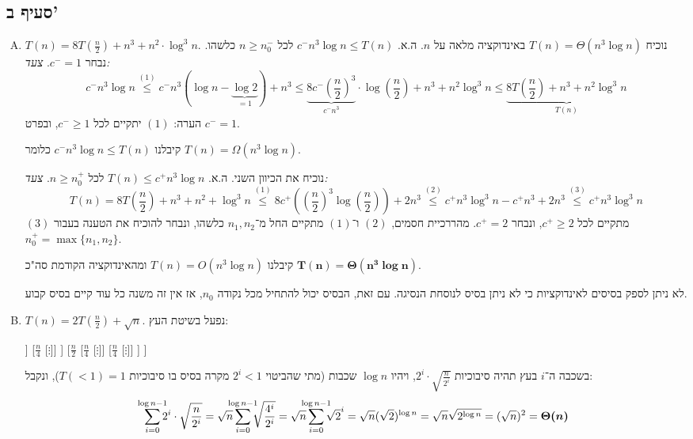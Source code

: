 \documentclass[]{article}
\newcommand\sen   {\begin{otherlanguage}{english}}
\newcommand\she   {\end{otherlanguage}}
\newcommand\logn  {\log n}
\newcommand\cl [1]    {\left ( #1 \right )}
\theoremstyle{definition}
\begin{document}
	\subsection{סעיף ב'}
	\begin{enumerate}[A.]
		\item $T(n) = 8T\cl{\frac{n}{2}} + n^3 + n^2 \cdot \log^3n$. נוכיח $T(n) = \Theta\cl{n^3\log n}$ באינדוקציה מלאה על $n$. ה.א. $c^-n^3\logn \le T(n)$ לכל $n \ge n_0^-$ כלשהו.
		נבחר $c^- = 1$. 
		\textit{צעד: }
		\[ c^-n^3\logn \overset{(1)}{\le} c^-n^3(\logn - \underbrace{\log 2}_{=1}) + n^3 \le \underbrace{8c^-\cl{\frac{n}{2}}^3}_{c^-n^3} \cdot \log\cl{\frac{n}{2}} + n^3 + n^2\log^3n \le \underbrace{8T\cl{\frac{n}{2}} + n^3 + n^2\log^3n}_{T(n)} \]
		הערה: $(1)$ יתקיים לכל $c^- \ge 1$, ובפרט $c^- = 1$. 
		
		קיבלנו $c^-n^3\log n \le T(n)$ כלומר $T(n) = \Omega\cl{n^3 \log n}$. 
		
		נוכיח את הכיוון השני. ה.א. $T(n) \le c^+n^3\logn$ לכל $n \ge n_0^+$. 
		\textit{צעד: }
		\[ T(n) = 8T\cl{\frac{n}{2}} + n^3 + n^2 + \log^3n \overset{(1)}{\le} 8c^+\cl{\cl{\frac{n}{2}}^3\log\cl{\frac{n}{2}}} + 2n^3 \overset{(2)}{\le} c^+n^3\log^3n - c^+n^3 + 2n^3 \overset{(3)}{\le} c^+n^3\log^3n \]
		$(3)$ מתקיים לכל $c^+ \ge 2$, ונבחר $c^+ = 2$. מהררכיית חסמים, $(2)$ ו־$(1)$ מתקיים החל מ־$n_1, n_2$ כלשהו, ונבחר להוכיח את הטענה בעבור $n_0^+ = \max\{n_1, n_2\}$. 
		
		קיבלנו $T(n) = O(n^3 \log n)$ ומהאינדוקציה הקודמת סה"כ $\bm{T(n) = \Theta\cl{n^3 \log n}}$. 
		
		לא ניתן לספק בסיסים לאינדוקציות כי לא ניתן בסיס לנוסחת הנסיגה. עם זאת, הבסיס יכול להתחיל מכל נקודה $n_0$, אז אין זה משנה כל עוד קיים בסיס קבוע. 
		
		
		\item $T(n) = 2T\cl{\frac{n}{2}} + \sqrt n$. נפעל בשיטת העץ: 
		\begin{center}\sen\begin{forest}
				[$n$
					[$\frac{n}{2}$
						[$\frac{n}{4}$ [$\vdots$]]
						[$\frac{n}{4}$ [$\vdots$]]
					]
					[$\frac{n}{2}$
						[$\frac{n}{4}$ [$\vdots$]]
						[$\frac{n}{4}$ [$\vdots$]]
					]
				]
			\end{forest}\she\end{center}
			בשכבה ה־$i$ בעץ תהיה סיבוכיות $2^i \cdot \sqrt{\frac{n}{2^i}}$, ויהיו $\logn$ שכבות (מתי שהביטוי $2^i < 1$ מקרה בסיס בו סיבוכיות $T(<1) = 1$), ונקבל: 
			\[ \sum_{i = 0}^{\mathclap{\logn - 1}}2^i \cdot \sqrt{\frac{n}{2^i}} = \sqrt n \sum_{i = 0}^{\mathclap{\logn - 1}}\sqrt{\frac{4^i}{2^i}} = \sqrt n\sum_{i = 0}^{\mathclap{\logn - 1}}\sqrt{2}^i = \sqrt n(\sqrt2)^{\logn} = \sqrt n \sqrt{2^{\logn}} = (\sqrt n)^2 = \bm{\Theta(n)} \]
		

\end{enumerate}
\end{document}
